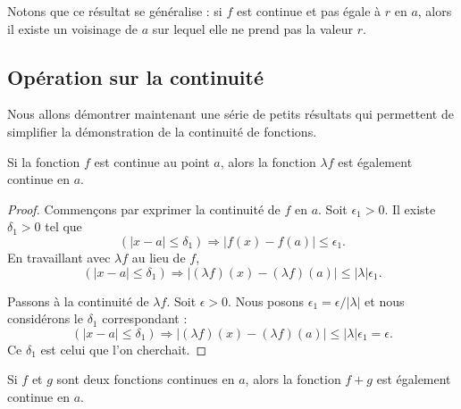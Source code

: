 Notons que ce résultat se généralise : si \( f\) est continue et pas égale à \( r\) en \( a\), alors il existe un voisinage de \( a\) sur lequel elle ne prend pas la valeur \( r\).

\subsection{Opération sur la continuité}

Nous allons démontrer maintenant une série de petits résultats qui permettent de simplifier la démonstration de la continuité de fonctions.
\begin{theorem}
	Si la fonction \( f\) est continue au point \( a\), alors la fonction \( \lambda f\) est également continue en \( a\).
\end{theorem}

\begin{proof}
	Commençons par exprimer la continuité de \( f\) en \( a\). Soit \( \epsilon_1>0\). Il existe \( \delta_1>0\) tel que
	\[
		(| x-a |\leq \delta_1)\Rightarrow | f(x)-f(a) |\leq \epsilon_1.
	\]
	En travaillant avec \( \lambda f\) au lieu de \( f\),
	\begin{equation}
		(| x-a |\leq\delta_1)\Rightarrow  | (\lambda f)(x)- (\lambda f)(a)|\leq | \lambda |\epsilon_1.
	\end{equation}

	Passons à la continuité de \( \lambda f\). Soit \( \epsilon>0\). Nous posons \( \epsilon_1=\epsilon/| \lambda |\) et nous considérons le \( \delta_1\) correspondant :
	\[
		(| x-a |\leq\delta_1)\Rightarrow  | (\lambda f)(x)- (\lambda f)(a)|\leq | \lambda |\epsilon_1=\epsilon.
	\]
	Ce \( \delta_1\) est celui que l'on cherchait.
\end{proof}

\begin{theorem}
	Si \( f\) et \( g\) sont deux fonctions continues en \( a\), alors la fonction \( f+g\) est également continue en \( a\).
\end{theorem}

